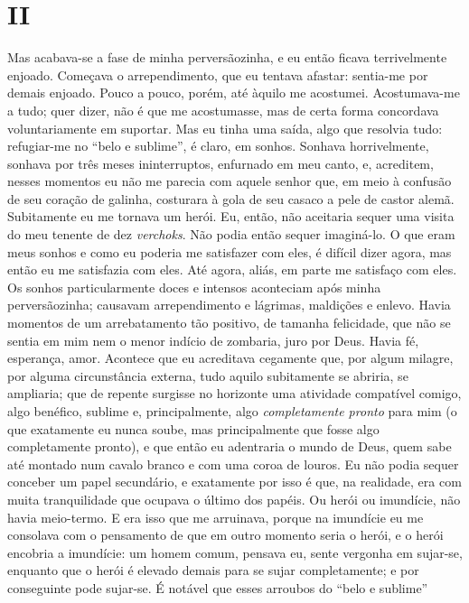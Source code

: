 \section{II}

Mas acabava-se a fase de minha perversãozinha, e eu então ficava
terrivelmente enjoado. Começava o arrependimento, que eu tentava
afastar: sentia-me por demais enjoado. Pouco a pouco, porém, até àquilo
me acostumei. Acostumava-me a tudo; quer dizer, não é que me
acostumasse, mas de certa forma concordava voluntariamente em suportar.
Mas eu tinha uma saída, algo que resolvia tudo: refugiar-me no “belo e
sublime”, é claro, em sonhos. Sonhava horrivelmente, sonhava por
três meses ininterruptos, enfurnado em meu canto, e, acreditem, nesses
momentos eu não me parecia com aquele senhor que, em meio à confusão de
seu coração de galinha, costurara à gola de seu casaco a pele de castor
alemã. Subitamente eu me tornava um herói. Eu, então, não aceitaria
sequer uma visita do meu tenente de dez \textit{verchoks}. Não podia
então sequer imaginá-lo. O que eram meus sonhos e como eu poderia me
satisfazer com eles, é difícil dizer agora, mas então eu me satisfazia
com eles. Até agora, aliás, em parte me satisfaço com eles. Os sonhos
particularmente doces e intensos aconteciam após minha perversãozinha;
causavam arrependimento e lágrimas, maldições e enlevo. Havia momentos
de um arrebatamento tão positivo, de tamanha felicidade, que não se
sentia em mim nem o menor indício de zombaria, juro por Deus. Havia fé,
esperança, amor. Acontece que eu acreditava cegamente que, por algum
milagre, por alguma circunstância externa, tudo aquilo subitamente se
abriria, se ampliaria; que de repente surgisse no horizonte uma
atividade compatível comigo, algo benéfico, sublime e, principalmente,
algo \textit{completamente pronto} para mim (o que
exatamente eu nunca soube, mas principalmente que fosse algo
completamente pronto), e que então eu adentraria o mundo de Deus, quem
sabe até montado num cavalo branco e com uma coroa de louros. Eu não
podia sequer conceber um papel secundário, e exatamente por isso é que,
na realidade, era com muita tranquilidade que ocupava o último dos
papéis. Ou herói ou imundície, não havia meio-termo. E era isso que me
arruinava, porque na imundície eu me consolava com o pensamento de que
em outro momento seria o herói, e o herói encobria a imundície: um
homem comum, pensava eu, sente vergonha em sujar-se, enquanto que o
herói é elevado demais para se sujar completamente; e por conseguinte
pode sujar-se. É notável que esses arroubos do “belo e sublime”
